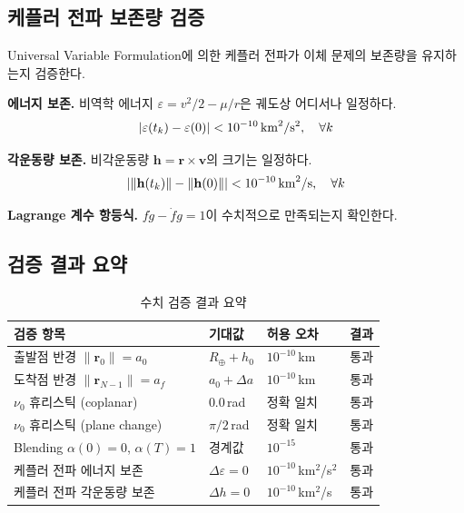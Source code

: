 \documentclass[11pt]{article}
\begin{document}
\subsection{케플러 전파 보존량 검증}
\label{sec:verify_kepler}

Universal Variable Formulation에 의한 케플러 전파가 이체 문제의 보존량을 유지하는지 검증한다.

\textbf{에너지 보존.}
비역학 에너지 $\varepsilon = v^2/2 - \mu/r$은 궤도상 어디서나 일정하다.
\[
\left| \varepsilon(t_k) - \varepsilon(0) \right| < 10^{-10} \text{\,km}^2/\text{s}^2, \quad \forall k
\]

\textbf{각운동량 보존.}
비각운동량 $\mathbf{h} = \mathbf{r} \times \mathbf{v}$의 크기는 일정하다.
\[
\left| \|\mathbf{h}(t_k)\| - \|\mathbf{h}(0)\| \right| < 10^{-10} \text{\,km}^2/\text{s}, \quad \forall k
\]

\textbf{Lagrange 계수 항등식.}
$f\dot{g} - \dot{f}g = 1$이 수치적으로 만족되는지 확인한다.


\subsection{검증 결과 요약}
\label{sec:verify_summary}

\begin{table}[htbp]
\centering
\caption{수치 검증 결과 요약}
\label{tab:verification_summary}
\begin{tabular}{@{}llll@{}}
\toprule
검증 항목 & 기대값 & 허용 오차 & 결과 \\
\midrule
출발점 반경 $\|\mathbf{r}_0\| = a_0$ & $R_\oplus + h_0$ & $10^{-10}$\,km & 통과 \\
도착점 반경 $\|\mathbf{r}_{N-1}\| = a_f$ & $a_0 + \Delta a$ & $10^{-10}$\,km & 통과 \\
$\nu_0$ 휴리스틱 (coplanar) & $0.0$\,rad & 정확 일치 & 통과 \\
$\nu_0$ 휴리스틱 (plane change) & $\pi/2$\,rad & 정확 일치 & 통과 \\
Blending $\alpha(0) = 0$, $\alpha(T) = 1$ & 경계값 & $10^{-15}$ & 통과 \\
케플러 전파 에너지 보존 & $\Delta\varepsilon = 0$ & $10^{-10}$\,km$^2$/s$^2$ & 통과 \\
케플러 전파 각운동량 보존 & $\Delta h = 0$ & $10^{-10}$\,km$^2$/s & 통과 \\
\bottomrule
\end{tabular}
\end{table}




\end{document}
